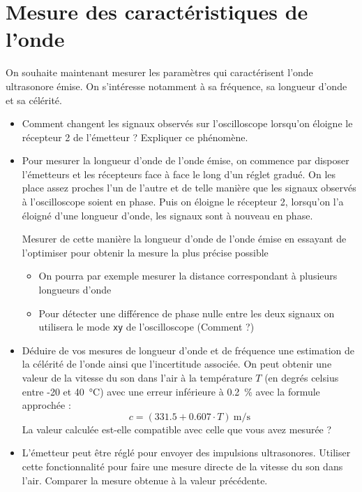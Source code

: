 \documentclass[]{tp}
\begin{document}
\section{Mesure des caractéristiques de l'onde}
On souhaite maintenant mesurer les paramètres qui caractérisent l'onde ultrasonore émise. On s'intéresse notamment à sa fréquence, sa longueur d'onde et sa célérité.
\begin{itemize}
  \item Comment changent les signaux observés sur l'oscilloscope lorsqu'on éloigne le récepteur 2 de l'émetteur ? Expliquer ce phénomène.

  \item Pour mesurer la longueur d'onde de l'onde émise, on commence par disposer l'émetteurs et les récepteurs face à face le long d'un réglet gradué. On les place assez proches l'un de l'autre et de telle manière que les signaux observés à l'oscilloscope soient en phase. Puis on éloigne le récepteur 2, lorsqu'on l'a éloigné d'une longueur d'onde, les signaux sont à nouveau en phase.

    Mesurer de cette manière la longueur d'onde de l'onde émise en essayant de l'optimiser pour obtenir la mesure la plus précise possible 
    \begin{itemize}
      \item On pourra par exemple mesurer la distance correspondant à plusieurs longueurs d'onde
      \item Pour détecter une différence de phase nulle entre les deux signaux on utilisera le mode \texttt{xy} de l'oscilloscope (Comment ?)
    \end{itemize}

  \item Déduire de vos mesures de longueur d'onde et de fréquence une estimation de la célérité de l'onde ainsi que l'incertitude associée. On peut obtenir une valeur de la vitesse du son dans l'air à la température $T$ (en degrés celsius entre -20 et \SI{+40}{\celsius}) avec une erreur inférieure à \SI{0.2}{\percent} avec la formule approchée :
    \begin{equation*}
      c=(331.5+0.607\cdot T)~\si{\m\per\s}
    \end{equation*}
    La valeur calculée est-elle compatible avec celle que vous avez mesurée ?

  \item L'émetteur peut être réglé pour envoyer des impulsions ultrasonores. Utiliser cette fonctionnalité pour faire une mesure directe de la vitesse du son dans l'air. Comparer la mesure obtenue à la valeur précédente.
\end{itemize}
\end{document}
